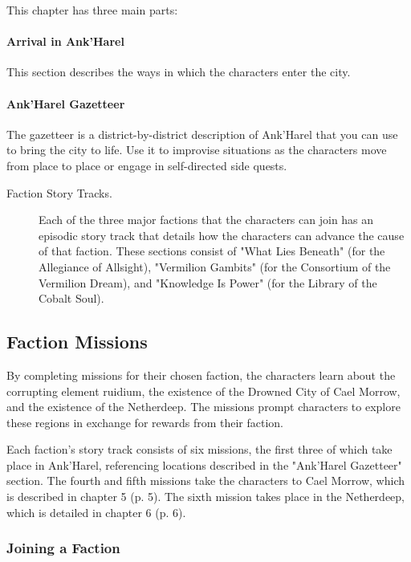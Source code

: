 \documentclass[a4paper, 11pt, bg=full, twocolumn, nooutline]{dndbook}
\begin{document}
This chapter has three main parts:

\paragraph{Arrival in Ank'Harel}

This section describes the ways in which the characters enter the city.

\paragraph{Ank'Harel Gazetteer}

The gazetteer is a district-by-district description of Ank'Harel that you can use to bring the city to life. Use it to improvise situations as the characters move from place to place or engage in self-directed side quests.

\begin{description}
\item[Faction Story Tracks.] Each of the three major factions that the characters can join has an episodic story track that details how the characters can advance the cause of that faction. These sections consist of "What Lies Beneath" (for the Allegiance of Allsight), "Vermilion Gambits" (for the Consortium of the Vermilion Dream), and "Knowledge Is Power" (for the Library of the Cobalt Soul).
\end{description}

\subsection{Faction Missions}

By completing missions for their chosen faction, the characters learn about the corrupting element ruidium, the existence of the Drowned City of Cael Morrow, and the existence of the Netherdeep. The missions prompt characters to explore these regions in exchange for rewards from their faction.

Each faction's story track consists of six missions, the first three of which take place in Ank'Harel, referencing locations described in the "Ank'Harel Gazetteer" section. The fourth and fifth missions take the characters to Cael Morrow, which is described in chapter 5 (p. 5). The sixth mission takes place in the Netherdeep, which is detailed in chapter 6 (p. 6).

\subsubsection{Joining a Faction}
\end{document}

